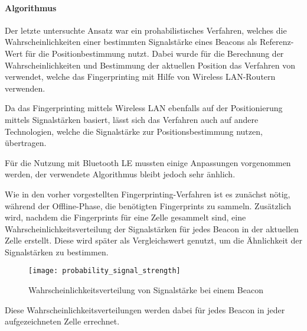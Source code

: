 \paragraph{Algorithmus}
\label{sec:implementation:fingerprinting:positioning:probability:algorithm}

Der letzte untersuchte Ansatz war ein prohabilistisches Verfahren, welches die Wahrscheinlichkeiten einer bestimmten Signalstärke eines Beacons als Referenz-Wert für die Positionbestimmung nutzt. Dabei wurde für die Berechnung der Wahrscheinlichkeiten und Bestimmung der aktuellen Position das Verfahren von \citet{wifiFingerprintProbability} verwendet, welche das Fingerprinting mit Hilfe von Wireless LAN-Routern verwenden.

Da das Fingerprinting mittels Wireless LAN ebenfalls auf der Positionierung mittels Signalstärken basiert, lässt sich das Verfahren auch auf andere Technologien, welche die Signalstärke zur Positionsbestimmung nutzen, übertragen.

Für die Nutzung mit Bluetooth LE mussten einige Anpassungen vorgenommen werden, der verwendete Algorithmus bleibt jedoch sehr änhlich.

Wie in den vorher vorgestellten Fingerprinting-Verfahren ist es zunächst nötig, während der Offline-Phase, die benötigten Fingerprints zu sammeln.
Zusätzlich wird, nachdem die Fingerprints für eine Zelle gesammelt sind, eine Wahrscheinlichkeitsverteilung der Signalstärken für jedes Beacon in der aktuellen Zelle erstellt. Diese wird später als Vergleichswert genutzt, um die Ähnlichkeit der Signalstärken zu bestimmen.

\begin{figure}[htb!]
		\centering
	\texttt{[image: probability\_signal\_strength]}
	\caption{Wahrscheinlichkeitsverteilung von Signalstärke bei einem Beacon}
	\label{probability-signal-strength-beacon}
\end{figure}

Diese Wahrscheinlichkeitsverteilungen werden dabei für jedes Beacon in jeder aufgezeichneten Zelle errechnet.


